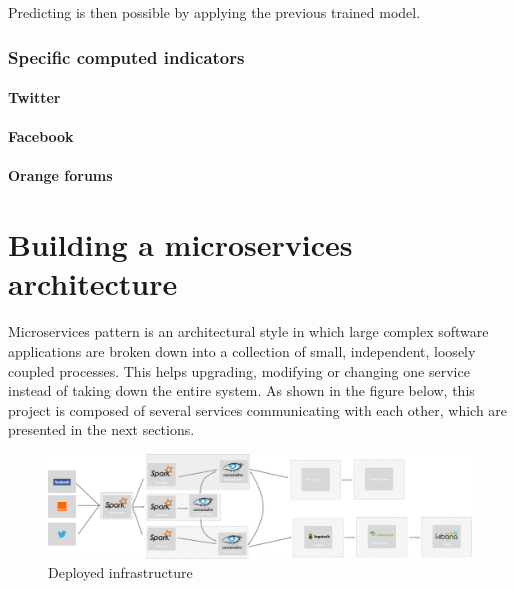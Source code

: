 \documentclass[11pt]{article}
\begin{document}
Predicting is then possible by applying the previous trained model.

\subsubsection{Specific computed indicators}

\paragraph{Twitter}


\paragraph{Facebook}

\paragraph{Orange forums}


\section{Building a microservices architecture}


Microservices pattern is an architectural style in which large complex software applications are broken down into a collection of small, independent, loosely coupled processes. This helps upgrading, modifying or changing one service instead of taking down the entire system. As shown in the figure below, this project is composed of several services communicating with each other, which are presented in the next sections.

\begin{figure}[h!]
    \centering
    \includegraphics[scale=0.1]{img/infra.png}
    \caption{Deployed infrastructure}
    \label{infra}
\end{figure}
\end{document}
